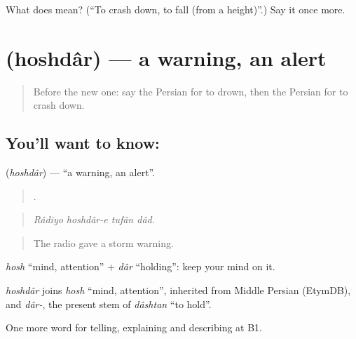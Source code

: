\begin{tcolorbox}[breakable,colback=teal!4,colframe=teal!35!black,title={Before you move on}]
What does   mean? (\textquotedblleft{}To crash down, to fall (from a height)\textquotedblright{}.) Say it once more.
\end{tcolorbox}
\section[\texorpdfstring{\fa{هشدار} (hoshdâr)}{هشدار (hoshdâr)}]{ (hoshdâr) — a warning, an alert}

\label{lesson:FA-C330-hoshdar}



\begin{quote}
Before the new one: say the Persian for to drown, then the Persian for to crash down.
\end{quote}

\subsection*{You'll want to know: }
\textbf{} (\emph{hoshdâr}) — \textquotedblleft{}a warning, an alert\textquotedblright{}.

\begin{quote}
   .
\end{quote}

\begin{quote}
\emph{Râdiyo hoshdâr-e tufân dâd.}
\end{quote}

\begin{quote}
The radio gave a storm warning.
\end{quote}

\emph{hosh} \textquotedblleft{}mind, attention\textquotedblright{} + \emph{dâr} \textquotedblleft{}holding\textquotedblright{}: keep your mind on it.

\begin{cousinweb}
\emph{hoshdâr} joins \emph{hosh} \textquotedblleft{}mind, attention\textquotedblright{}, inherited from Middle Persian (EtymDB), and \emph{dâr-}, the present stem of \emph{dâshtan} \textquotedblleft{}to hold\textquotedblright{}.
\end{cousinweb}

\begin{grammarlens}[title={What you've built}]
One more word for telling, explaining and describing at B1.
\end{grammarlens}

